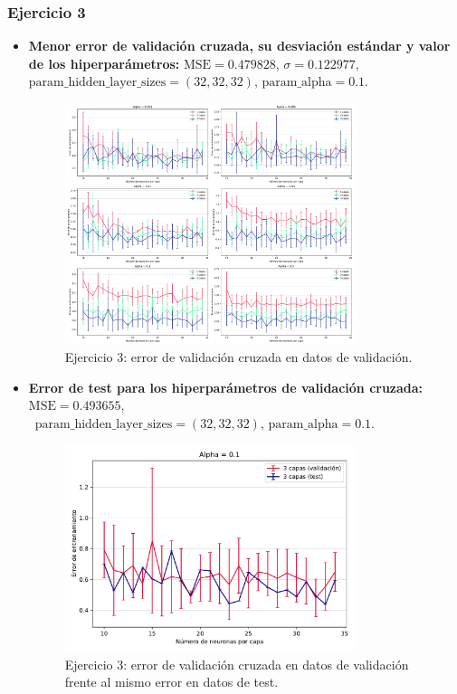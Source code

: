 \documentclass[11pt]{article}
\begin{document}
\subsubsection*{Ejercicio 3}

\begin{itemize}
    \item \textbf{Menor error de validación cruzada, su desviación estándar y valor de los hiperparámetros:} $\text{MSE} = 0.479828$, $\sigma = 0.122977$, $\text{param\_hidden\_layer\_sizes} = (32, 32, 32)$, $\text{param\_alpha} = 0.1$.
    \begin{figure}[h]
    \centering
    \includegraphics[width=0.8\textwidth]{fotos/ej3_1.pdf}
    \caption{Ejercicio 3: error de validación cruzada en datos de validación.}
    \end{figure}
    \item \textbf{Error de test para los hiperparámetros de validación cruzada:} $\text{MSE} = 0.493655$, \\ $\text{param\_hidden\_layer\_sizes} = (32, 32, 32)$, $\text{param\_alpha} = 0.1$.
    \begin{figure}[h]
    \centering
    \includegraphics[width=0.8\textwidth]{fotos/ej3_2.pdf}
    \caption{Ejercicio 3: error de validación cruzada en datos de validación frente al mismo error en datos de test.}
    \end{figure}
\end{itemize}
\end{document}
